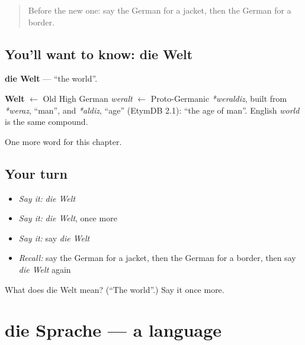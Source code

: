 \label{lesson:GE-C100-welt}



\begin{quote}
Before the new one: say the German for a jacket, then the German for a border.
\end{quote}

\subsection*{You'll want to know: die Welt}
\textbf{die Welt} — \textquotedblleft{}the world\textquotedblright{}.

\begin{cousinweb}
\textbf{Welt} $\leftarrow$ Old High German \emph{weralt} $\leftarrow$ Proto-Germanic \emph{*weraldiz}, built from \emph{*weraz}, \textquotedblleft{}man\textquotedblright{}, and \emph{*aldiz}, \textquotedblleft{}age\textquotedblright{} (EtymDB 2.1): \textquotedblleft{}the age of man\textquotedblright{}. English \emph{world} is the same compound.
\end{cousinweb}

\begin{grammarlens}[title={What you've built}]
One more word for this chapter.
\end{grammarlens}

\subsection*{Your turn}
\begin{itemize}
\raggedright
  \item \emph{Say it:} \emph{die Welt}
  \item \emph{Say it:} \emph{die Welt}, once more
  \item \emph{Say it:} say \emph{die Welt}
  \item \emph{Recall:} say the German for a jacket, then the German for a border, then say \emph{die Welt} again
\end{itemize}

\begin{tcolorbox}[breakable,colback=teal!4,colframe=teal!35!black,title={Before you move on}]
What does die Welt mean? (\textquotedblleft{}The world\textquotedblright{}.) Say it once more.
\end{tcolorbox}
\section[die Sprache]{die Sprache — a language}

